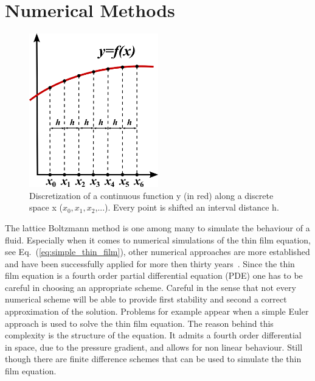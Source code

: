 \section{Numerical Methods}
\label{sec:numerical_methods}
\begin{figure}
    \centering
    \includegraphics[width=0.5\textwidth]{graphics/800px-Finite_Differences.svg.png}
    \caption{Discretization of a continuous function y (in red) along a discrete space x ($x_0, x_1, x_2$,...).
    Every point is shifted an interval distance h.
    }
    \label{fig:finite_difference}
\end{figure}
The lattice Boltzmann method is one among many to simulate the behaviour of a fluid.
Especially when it comes to numerical simulations of the thin film equation, see Eq.~(\ref{eq:simple_thin_film}), other numerical approaches are more established and have been successfully applied for more then thirty years~\cite{becker2003complex, Peschka9275, PhysRevLett.95.244505, Mecke_2005, PhysRevE.63.011208, SCHWARTZ1998173}.
Since the thin film equation is a fourth order partial differential equation (PDE) one has to be careful in choosing an appropriate scheme.
Careful in the sense that not every numerical scheme will be able to provide first stability and second a correct approximation of the solution.
Problems for example appear when a simple Euler approach is used to solve the thin film equation.
The reason behind this complexity is the structure of the equation. 
It admits a fourth order differential in space, due to the pressure gradient, and allows for non linear behaviour.
Still though there are finite difference schemes that can be used to simulate the thin film equation.


